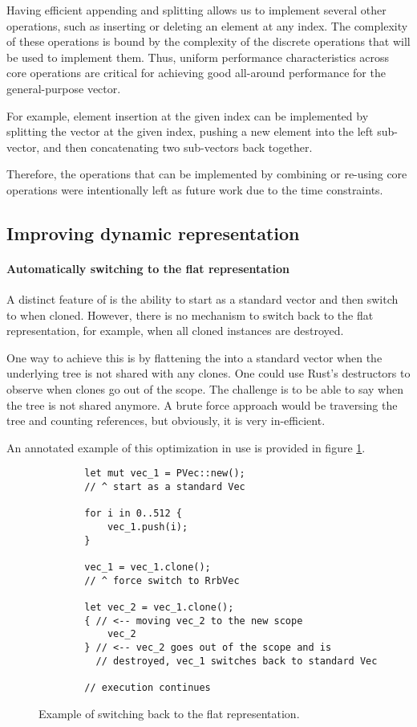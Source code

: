 Having efficient appending and splitting allows us to implement several other operations, such as inserting or deleting an element at any index. The complexity of these operations is bound by the complexity of the discrete operations that will be used to implement them. Thus, uniform performance characteristics across core operations are critical for achieving good all-around performance for the general-purpose vector. 

For example, element insertion at the given index can be implemented by splitting the vector at the given index, pushing a new element into the left sub-vector, and then concatenating two sub-vectors back together.

Therefore, the operations that can be implemented by combining or re-using core operations were intentionally left as future work due to the time constraints.

\subsection{Improving dynamic representation}

\paragraph{Automatically switching to the flat representation}
A distinct feature of \pvec{} is the ability to start as a standard vector and then switch to \rrbvec{} when cloned. However, there is no mechanism to switch back to the flat representation, for example, when all cloned instances are destroyed. 

One way to achieve this is by flattening the \rrbtree{} into a standard vector when the underlying tree is not shared with any clones. One could use Rust's destructors to observe when \pvec{} clones go out of the scope. The challenge is to be able to say when the tree is not shared anymore. A brute force approach would be traversing the tree and counting references, but obviously, it is very in-efficient. 

An annotated example of this optimization in use is provided in figure \ref{fig:switching-to-flat}. 

\begin{figure}[H] 
    \centering

    \begin{verbatim}
        let mut vec_1 = PVec::new();
        // ^ start as a standard Vec

        for i in 0..512 {
            vec_1.push(i);            
        }

        vec_1 = vec_1.clone();
        // ^ force switch to RrbVec

        let vec_2 = vec_1.clone();
        { // <-- moving vec_2 to the new scope
            vec_2
        } // <-- vec_2 goes out of the scope and is 
          // destroyed, vec_1 switches back to standard Vec           

        // execution continues
    \end{verbatim}

    \caption{Example of switching back to the flat representation.}
    \label{fig:switching-to-flat}
\end{figure}


